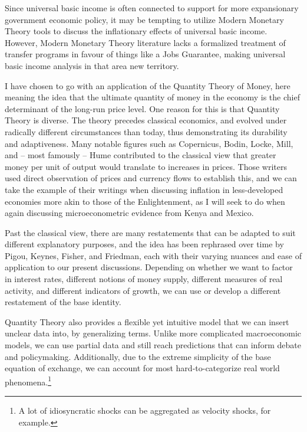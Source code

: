 \documentclass[paper=a4, fontsize=11pt,twoside]{scrartcl}
\begin{document}
Since universal basic income is often connected to support for more expansionary government economic policy, it may be tempting to utilize Modern Monetary Theory tools to discuss the inflationary effects of universal basic income. However, Modern Monetary Theory literature lacks a formalized treatment of transfer programs in favour of things like a Jobs Guarantee, making universal basic income analysis in that area new territory. 

I have chosen to go with an application of the Quantity Theory of Money, here meaning the idea that the ultimate quantity of money in the economy is the chief determinant of the long-run price level. One reason for this is that Quantity Theory is diverse. The theory precedes classical economics\autocite{history}, and evolved under radically different circumstances than today, thus demonstrating its durability and adaptiveness. Many notable figures such as Copernicus\autocite{copernicus}, Bodin\autocite{bodin}, Locke\autocite{locke}, Mill\autocite{mill}, and -- most famously -- Hume\autocite{hume} contributed to the classical view that greater money per unit of output would translate to increases in prices. Those writers used direct observation of prices and currency flows to establish this, and we can take the example of their writings when discussing inflation in less-developed economies more akin to those of the Enlightenment, as I will seek to do when again discussing microeconometric evidence from Kenya and Mexico. 

Past the classical view, there are many restatements that can be adapted to suit different explanatory purposes, and the idea has been rephrased over time by Pigou\autocite{pigou:value}, Keynes\autocite{keynes:tract}, Fisher\autocite{fisher:ppom}, and Friedman\autocite{friedman:restatement, friedman:quantity}, each with their varying nuances and ease of application to our present discussions. Depending on whether we want to factor in interest rates, different notions of money supply, different measures of real activity, and different indicators of growth, we can use or develop a different restatement of the base identity. 

Quantity Theory also provides a flexible yet intuitive model that we can insert unclear data into, by generalizing terms. Unlike more complicated macroeconomic models, we can use partial data and still reach predictions that can inform debate and policymaking. Additionally, due to the extreme simplicity of the base equation of exchange, we can account for most hard-to-categorize real world phenomena.\footnote{A lot of idiosyncratic shocks can be aggregated as velocity shocks, for example.} 
\end{document}
